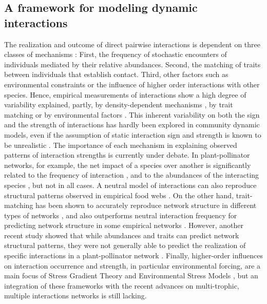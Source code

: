 \subsection*{A framework for modeling dynamic interactions}

The realization and outcome of direct pairwise interactions is dependent on three classes of mechanisms \citep{Poisot2015}: First, the frequency of stochastic encounters of individuals mediated by their relative abundances. Second, the matching of traits between individuals that establish contact. Third, other factors such as environmental constraints or the influence of higher order interactions with other species. Hence, empirical measurements of interactions show a high degree of variability explained, partly, by density-dependent mechanisms \citep{Aizen2014}, by trait matching \citep{Santamaria2007} or by environmental factors \citep{Mazia2016,Poisot2017}. This inherent variability on both the sign and the strength of interactions has hardly been explored in community dynamic models, even if the assumption of static interaction sign and strength is known to be unrealistic \citep{Abrams1980,Abrams2001,Hernandez1998,Holland2009}. The importance of each mechanism in explaining observed patterns of interaction strengths is currently under debate. In plant-pollinator networks, for example, the net impact of a species over another is significantly related to the frequency of interaction \citep{Vazquez2005,Vazquez2012}, and to the abundances of the interacting species \citep{Vazquez2007}, but not in all cases. A neutral model of interactions can also reproduce structural patterns observed in empirical food webs \citep{Canard2012}. On the other hand, trait-matching has been shown to accurately reproduce network structure in different types of networks \citep{Eklof2013}, and also outperforms neutral interaction frequency for predicting network structure in some empirical networks \citep{Vizentin-Bugoni2014,Sazatornil2016}. However, another recent study showed that while abundances and traits can predict network structural patterns, they were not generally able to predict the realization of specific interactions in a plant-pollinator network \citep{Olito2014}. Finally, higher-order influences on interaction occurrence and strength, in particular environmental forcing, are a main focus of Stress Gradient Theory \citep{Maestre2009} and Environmental Stress Models \citep{Menge1987}, but an integration of these frameworks with the recent advances on multi-trophic, multiple interactions networks is still lacking.


